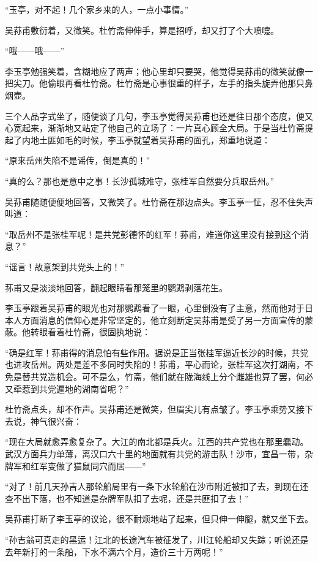 \par “玉亭，对不起！几个家乡来的人，一点小事情。”
\par 吴荪甫敷衍着，又微笑。杜竹斋伸伸手，算是招呼，却又打了个大喷嚏。
\par “哦——哦——”
\par 李玉亭勉强笑着，含糊地应了两声；他心里却只要哭，他觉得吴荪甫的微笑就像一把尖刀。他偷眼再看杜竹斋。杜竹斋是心事很重的样子，左手的指头旋弄他那只鼻烟壶。
\par 三个人品字式坐了，随便谈了几句，李玉亭觉得吴荪甫也还是往日那个态度，便又心宽起来，渐渐地又站定了他自己的立场了：一片真心顾全大局。于是当杜竹斋提起了内地土匪如毛的时候，李玉亭就望着吴荪甫的面孔，郑重地说道：
\par “原来岳州失陷不是谣传，倒是真的！”
\par “真的么？那也是意中之事！长沙孤城难守，张桂军自然要分兵取岳州。”
\par 吴荪甫随随便便地回答，又微笑了。杜竹斋在那边点头。李玉亭一怔，忍不住失声叫道：
\par “取岳州不是张桂军呢！是共党彭德怀的红军！荪甫，难道你这里没有接到这个消息？”
\par “谣言！故意架到共党头上的！”
\par 荪甫又是淡淡地回答，翻起眼睛看那笼里的鹦鹉剥落花生。
\par 李玉亭跟着吴荪甫的眼光也对那鹦鹉看了一眼，心里倒没有了主意，然而他对于日本人方面消息的信仰心是非常坚定的，他立刻断定吴荪甫是受了另一方面宣传的蒙蔽。他转眼看着杜竹斋，很固执地说：
\par “确是红军！荪甫得的消息怕有些作用。据说是正当张桂军逼近长沙的时候，共党也进攻岳州。两处是差不多同时失陷的！荪甫，平心而论，张桂军这次打湖南，不免是替共党造机会。可不是么，竹斋，他们就在陇海线上分个雌雄也算了罢，何必又牵惹到共党遍地的湖南省呢？”
\par 杜竹斋点头，却不作声。吴荪甫还是微笑，但眉尖儿有点皱了。李玉亭乘势又接下去说，神气很兴奋：
\par “现在大局就愈弄愈复杂了。大江的南北都是兵火。江西的共产党也在那里蠢动。武汉方面兵力单薄，离汉口六十里的地面就有共党的游击队！沙市，宜昌一带，杂牌军和红军变做了猫鼠同穴而居——”
\par “对了！前几天孙吉人那轮船局里有一条下水轮船在沙市附近被扣了去，到现在还查不出下落，也不知道是杂牌军队扣了去呢，还是共匪扣了去！”
\par 吴荪甫打断了李玉亭的议论，很不耐烦地站了起来，但只伸一伸腿，就又坐下去。
\par “孙吉翁可真走的黑运！江北的长途汽车被征发了，川江轮船却又失踪；听说还是去年新打的一条船，下水不满六个月，造价三十万两呢！”
